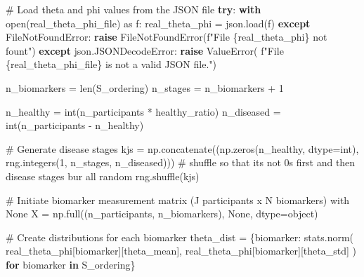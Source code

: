\documentclass[
  letterpaper,
  DIV=11,
  numbers=noendperiod]{scrreprt}
\newenvironment{Shaded}{\begin{snugshade}}{\end{snugshade}}
\newcommand{\BuiltInTok}[1]{\textcolor[rgb]{0.00,0.23,0.31}{#1}}
\newcommand{\CommentTok}[1]{\textcolor[rgb]{0.37,0.37,0.37}{#1}}
\newcommand{\ControlFlowTok}[1]{\textcolor[rgb]{0.00,0.23,0.31}{\textbf{#1}}}
\newcommand{\DecValTok}[1]{\textcolor[rgb]{0.68,0.00,0.00}{#1}}
\newcommand{\ImportTok}[1]{\textcolor[rgb]{0.00,0.46,0.62}{#1}}
\newcommand{\KeywordTok}[1]{\textcolor[rgb]{0.00,0.23,0.31}{\textbf{#1}}}
\newcommand{\NormalTok}[1]{\textcolor[rgb]{0.00,0.23,0.31}{#1}}
\newcommand{\OperatorTok}[1]{\textcolor[rgb]{0.37,0.37,0.37}{#1}}
\newcommand{\PreprocessorTok}[1]{\textcolor[rgb]{0.68,0.00,0.00}{#1}}
\newcommand{\SpecialCharTok}[1]{\textcolor[rgb]{0.37,0.37,0.37}{#1}}
\newcommand{\SpecialStringTok}[1]{\textcolor[rgb]{0.13,0.47,0.30}{#1}}
\newcommand{\StringTok}[1]{\textcolor[rgb]{0.13,0.47,0.30}{#1}}
\newcommand{\VariableTok}[1]{\textcolor[rgb]{0.07,0.07,0.07}{#1}}
\begin{document}
\begin{Shaded}
\begin{Highlighting}[]
    \CommentTok{\# Load theta and phi values from the JSON file}
    \ControlFlowTok{try}\NormalTok{:}
        \ControlFlowTok{with} \BuiltInTok{open}\NormalTok{(real\_theta\_phi\_file) }\ImportTok{as}\NormalTok{ f:}
\NormalTok{            real\_theta\_phi }\OperatorTok{=}\NormalTok{ json.load(f)}
    \ControlFlowTok{except} \PreprocessorTok{FileNotFoundError}\NormalTok{:}
        \ControlFlowTok{raise} \PreprocessorTok{FileNotFoundError}\NormalTok{(}\SpecialStringTok{f"File }\SpecialCharTok{\{}\NormalTok{real\_theta\_phi}\SpecialCharTok{\}}\SpecialStringTok{ not fount"}\NormalTok{)}
    \ControlFlowTok{except}\NormalTok{ json.JSONDecodeError:}
        \ControlFlowTok{raise} \PreprocessorTok{ValueError}\NormalTok{(}
            \SpecialStringTok{f"File }\SpecialCharTok{\{}\NormalTok{real\_theta\_phi\_file}\SpecialCharTok{\}}\SpecialStringTok{ is not a valid JSON file."}\NormalTok{)}

\NormalTok{    n\_biomarkers }\OperatorTok{=} \BuiltInTok{len}\NormalTok{(S\_ordering)}
\NormalTok{    n\_stages }\OperatorTok{=}\NormalTok{ n\_biomarkers }\OperatorTok{+} \DecValTok{1}

\NormalTok{    n\_healthy }\OperatorTok{=} \BuiltInTok{int}\NormalTok{(n\_participants }\OperatorTok{*}\NormalTok{ healthy\_ratio)}
\NormalTok{    n\_diseased }\OperatorTok{=} \BuiltInTok{int}\NormalTok{(n\_participants }\OperatorTok{{-}}\NormalTok{ n\_healthy)}

    \CommentTok{\# Generate disease stages}
\NormalTok{    kjs }\OperatorTok{=}\NormalTok{ np.concatenate((np.zeros(n\_healthy, dtype}\OperatorTok{=}\BuiltInTok{int}\NormalTok{),}
\NormalTok{                         rng.integers(}\DecValTok{1}\NormalTok{, n\_stages, n\_diseased)))}
    \CommentTok{\# shuffle so that it\textquotesingle{}s not 0s first and then disease stages bur all random}
\NormalTok{    rng.shuffle(kjs)}

    \CommentTok{\# Initiate biomarker measurement matrix (J participants x N biomarkers) with None}
\NormalTok{    X }\OperatorTok{=}\NormalTok{ np.full((n\_participants, n\_biomarkers), }\VariableTok{None}\NormalTok{, dtype}\OperatorTok{=}\BuiltInTok{object}\NormalTok{)}

    \CommentTok{\# Create distributions for each biomarker}
\NormalTok{    theta\_dist }\OperatorTok{=}\NormalTok{ \{biomarker: stats.norm(}
\NormalTok{        real\_theta\_phi[biomarker][}\StringTok{\textquotesingle{}theta\_mean\textquotesingle{}}\NormalTok{],}
\NormalTok{        real\_theta\_phi[biomarker][}\StringTok{\textquotesingle{}theta\_std\textquotesingle{}}\NormalTok{]}
\NormalTok{    ) }\ControlFlowTok{for}\NormalTok{ biomarker }\KeywordTok{in}\NormalTok{ S\_ordering\}}


\end{Highlighting}
\end{Shaded}
\end{document}
